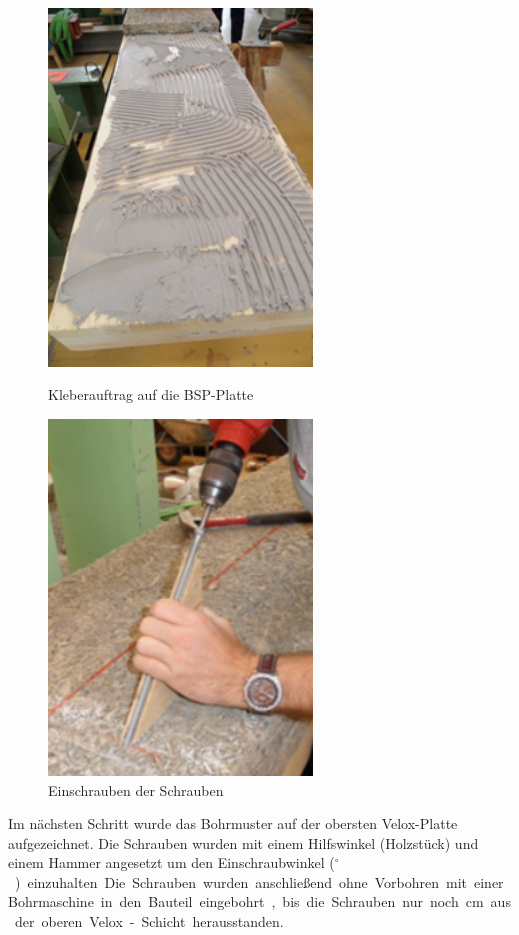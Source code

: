 \begin{figure}[h!]
	\begin{minipage}[h]{7cm}	
	 	\includegraphics[width=7cm]{Aufbau/herstellung/kleberauftrag.png}
		\caption{Kleberauftrag auf die BSP-Platte}
		\label{kleberauftrag}
	\end{minipage}
		\hfill
	\begin{minipage}[h]{7cm}
		\includegraphics[width=7cm]{Aufbau/herstellung/einschrauben.png}
		\caption{Einschrauben der Schrauben}
		\label{einschrauben}
	\end{minipage}
\end{figure}




Im nächsten Schritt wurde das Bohrmuster auf der obersten Velox-Platte aufgezeichnet. Die Schrauben wurden mit einem Hilfswinkel (Holzstück) und einem Hammer angesetzt um den Einschraubwinkel   (\unit[45]{$^{\circ}$}) einzuhalten. Die Schrauben wurden anschließend ohne Vorbohren mit einer Bohrmaschine in den Bauteil eingebohrt, bis die Schrauben nur noch \unit[4]{cm} aus der oberen Velox-Schicht herausstanden. 
	

